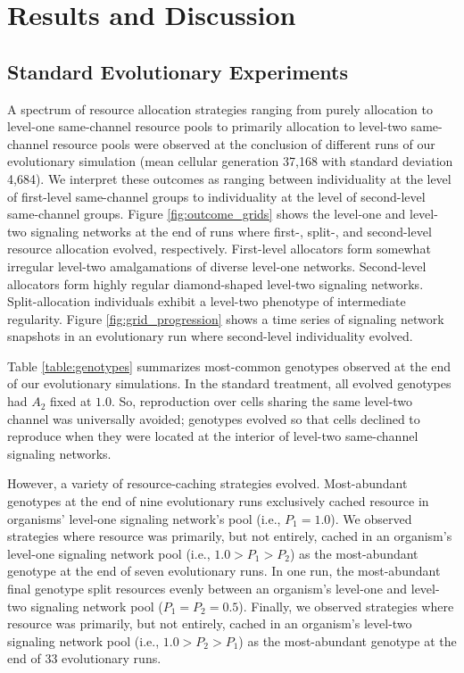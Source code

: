 \section{Results and Discussion}

\subsection{Standard Evolutionary Experiments}







A spectrum of resource allocation strategies ranging from purely allocation to level-one same-channel resource pools to primarily allocation to level-two same-channel resource pools were observed at the conclusion of different runs of our evolutionary simulation (mean cellular generation 37,168 with standard deviation 4,684).
We interpret these outcomes as ranging between individuality at the level of first-level same-channel groups to individuality at the level of second-level same-channel groups.
Figure \ref{fig:outcome_grids} shows the level-one and level-two signaling networks at the end of runs where first-, split-, and second-level resource allocation evolved, respectively.
First-level allocators form somewhat irregular level-two amalgamations of diverse level-one networks.
Second-level allocators form highly regular diamond-shaped level-two signaling networks.
Split-allocation individuals exhibit a level-two phenotype of intermediate regularity.
Figure \ref{fig:grid_progression} shows a time series of signaling network snapshots in an evolutionary run where second-level individuality evolved.

Table \ref{table:genotypes} summarizes most-common genotypes observed at the end of our evolutionary simulations.
In the standard treatment, all evolved genotypes had $A_2$ fixed at $1.0$.
So, reproduction over cells sharing the same level-two channel was universally avoided;
genotypes evolved so that cells declined to reproduce when they were located at the interior of level-two same-channel signaling networks.

However, a variety of resource-caching strategies evolved.
Most-abundant genotypes at the end of nine evolutionary runs exclusively cached resource in organisms' level-one signaling network's pool (i.e., $P_1 = 1.0$).
We observed strategies where resource was primarily, but not entirely, cached in an organism's level-one signaling network pool (i.e., $1.0 > P_1 > P_2$) as the most-abundant genotype at the end of seven evolutionary runs.
In one run, the most-abundant final genotype split resources evenly between an organism's level-one and level-two signaling network pool ($P_1 = P_2 = 0.5$).
Finally, we observed strategies where resource was primarily, but not entirely, cached in an organism's level-two signaling network pool (i.e., $1.0 > P_2 > P_1$) as the most-abundant genotype at the end of 33 evolutionary runs.

